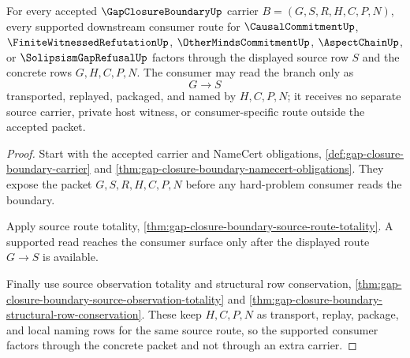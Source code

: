\begin{theorem}
\label{thm:gap-closure-boundary-source-route-completeness}
For every accepted $\GapClosureBoundaryUp$ carrier $B=(G,S,R,H,C,P,N)$, every supported downstream consumer route for $\CausalCommitmentUp$, $\FiniteWitnessedRefutationUp$, $\OtherMindsCommitmentUp$, $\AspectChainUp$, or $\SolipsismGapRefusalUp$ factors through the displayed source row $S$ and the concrete rows $G,H,C,P,N$. The consumer may read the branch only as
$$
G \longrightarrow S
$$
transported, replayed, packaged, and named by $H,C,P,N$; it receives no separate source carrier, private host witness, or consumer-specific route outside the accepted packet.
\end{theorem}
\begin{proof}
Start with the accepted carrier and NameCert obligations, \autoref{def:gap-closure-boundary-carrier} and \autoref{thm:gap-closure-boundary-namecert-obligations}. They expose the packet $G,S,R,H,C,P,N$ before any hard-problem consumer reads the boundary.

Apply source route totality, \autoref{thm:gap-closure-boundary-source-route-totality}. A supported read reaches the consumer surface only after the displayed route $G \longrightarrow S$ is available.

Finally use source observation totality and structural row conservation, \autoref{thm:gap-closure-boundary-source-observation-totality} and \autoref{thm:gap-closure-boundary-structural-row-conservation}. These keep $H,C,P,N$ as transport, replay, package, and local naming rows for the same source route, so the supported consumer factors through the concrete packet and not through an extra carrier.
\end{proof}

